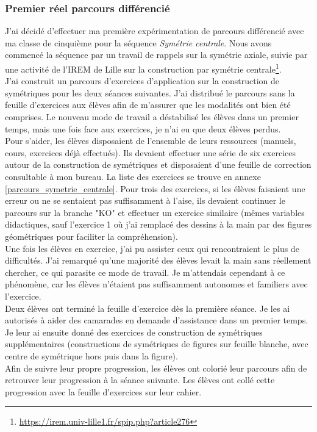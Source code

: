 \subsubsection{Premier réel parcours différencié}
J'ai décidé d'effectuer ma première expérimentation de parcours différencié avec ma classe de cinquième pour la séquence \emph{Symétrie centrale}. Nous avons commencé la séquence par un travail de rappels sur la symétrie axiale, suivie par une activité de l'IREM de Lille sur la construction par symétrie centrale\footnote{\url{https://irem.univ-lille1.fr/spip.php?article276}}.\\
J'ai construit un parcours d'exercices d'application sur la construction de symétriques pour les deux séances suivantes. J'ai distribué le parcours sans la feuille d'exercices aux élèves afin de m'assurer que les modalités ont bien été comprises. Le nouveau mode de travail a déstabilisé les élèves dans un premier temps, mais une fois face aux exercices, je n'ai eu que deux élèves perdus.\\
Pour s'aider, les élèves disposaient de l'ensemble de leurs ressources (manuels, cours, exercices déjà effectués). Ils devaient effectuer une série de six exercices autour de la construction de symétriques et disposaient d'une feuille de correction consultable à mon bureau. La liste des exercices se trouve en annexe \ref{parcours_symetrie_centrale}. Pour trois des exercices, si les élèves faisaient une erreur ou ne se sentaient pas suffisamment à l'aise, ils devaient continuer le parcours sur la branche "KO" et effectuer un exercice similaire (mêmes variables didactiques, sauf l'exercice 1 où j'ai remplacé des dessins à la main par des figures géométriques pour faciliter la compréhension).\\
Une fois les élèves en exercice, j'ai pu assister ceux qui rencontraient le plus de difficultés. J'ai remarqué qu'une majorité des élèves levait la main sans réellement chercher, ce qui parasite ce mode de travail. Je m'attendais cependant à ce phénomène, car les élèves n'étaient pas suffisamment autonomes et familiers avec l'exercice.\\
Deux élèves ont terminé la feuille d'exercice dès la première séance. Je les ai autorisés à aider des camarades en demande d'assistance dans un premier temps. Je leur ai ensuite donné des exercices de construction de symétriques supplémentaires (constructions de symétriques de figures sur feuille blanche, avec centre de symétrique hors puis dans la figure).\\
Afin de suivre leur propre progression, les élèves ont colorié leur parcours afin de retrouver leur progression à la séance suivante. Les élèves ont collé cette progression avec la feuille d'exercices sur leur cahier.\\
